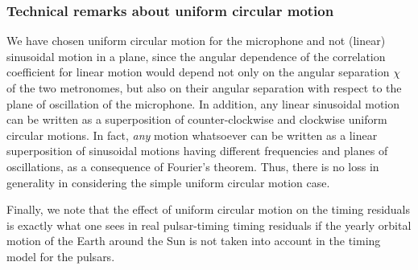 \documentclass[10pt]{NSF}
\begin{document}
\subsubsection{Technical remarks about uniform circular motion}

We have chosen uniform circular motion for the microphone
and not (linear) sinusoidal motion in a plane, since the angular
dependence of the correlation coefficient for linear motion 
would depend not only on the angular separation $\chi$ of the two 
metronomes, but also on their angular separation with respect to
the plane of oscillation of the microphone.
In addition, any linear sinusoidal motion can be written as a 
superposition of counter-clockwise and clockwise uniform circular
motions.
In fact, {\em any} motion whatsoever can be written as a linear superposition
of sinusoidal motions having different frequencies and planes of
oscillations, as a consequence of Fourier's theorem.
Thus, there is no loss in generality in considering the simple
uniform circular motion case.

Finally, we note that the effect of uniform circular motion on the 
timing residuals 
is exactly what one sees in real pulsar-timing timing residuals if the 
yearly orbital motion 
of the Earth around the Sun is not taken into account in the timing
model for the pulsars.
\end{document}
